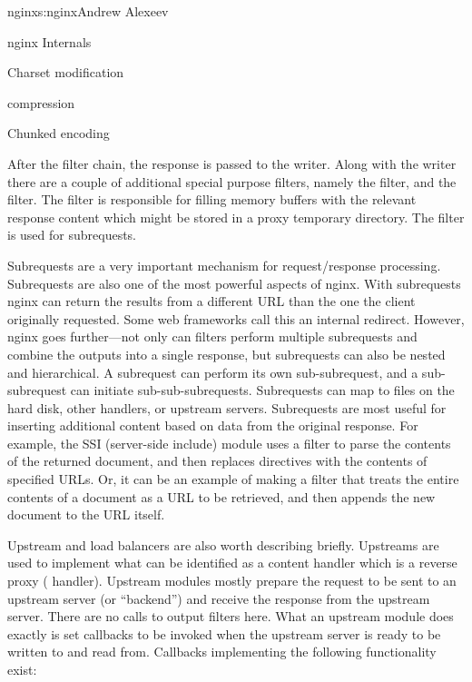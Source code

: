 \begin{aosachapter}{nginx}{s:nginx}{Andrew Alexeev}
\begin{aosasect1}{nginx Internals}
\begin{aosaitemize}
\item Charset modification

\item {} compression

\item Chunked encoding

\end{aosaitemize}

After the filter chain, the response is passed to the writer. Along
with the writer there are a couple of additional special purpose
filters, namely the  filter, and the 
filter. The  filter is responsible for filling memory
buffers with the relevant response content which might be stored in a
proxy temporary directory. The  filter is used for
subrequests.

Subrequests are a very important mechanism for request/response
processing. Subrequests are also one of the most powerful aspects of
nginx. With subrequests nginx can return the results from a different
URL than the one the client originally requested. Some web frameworks
call this an internal redirect. However, nginx goes further---not only
can filters perform multiple subrequests and combine the outputs into
a single response, but subrequests can also be nested and
hierarchical. A subrequest can perform its own sub-subrequest, and a
sub-subrequest can initiate sub-sub-subrequests. Subrequests can map
to files on the hard disk, other handlers, or upstream
servers. Subrequests are most useful for inserting additional content
based on data from the original response. For example, the SSI
(server-side include) module uses a filter to parse the contents of
the returned document, and then replaces  directives
with the contents of specified URLs. Or, it can be an example of making
a filter that treats the entire contents of a document as a URL to be
retrieved, and then appends the new document to the URL itself.


Upstream and load balancers are also worth describing
briefly. Upstreams are used to implement what can be identified as a
content handler which is a reverse proxy (
handler). %
Upstream modules mostly prepare the request to be sent to an upstream
server (or ``backend'') and receive the response from the upstream
server. There are no calls to output filters here. What an upstream
module does exactly is set callbacks to be invoked when the upstream
server is ready to be written to and read from. Callbacks implementing
the following functionality exist:


\end{aosasect1}
\end{aosachapter}
